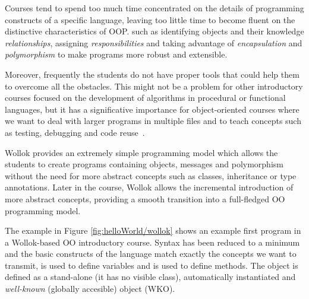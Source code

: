
Courses tend to spend too much time concentrated on the details of programming constructs of a specific language, leaving too little time to become fluent on the distinctive characteristics of OOP. 
such as identifying objects and their knowledge \emph{relationships}, assigning \emph{responsibilities} 
and taking advantage of \emph{encapsulation} and \emph{polymorphism} to make programs more robust and extensible.

Moreover, frequently the students do not have proper tools that could help them to overcome all the obstacles.
This might not be a problem for other introductory courses focused on the development of algorithms in procedural or functional languages, 
but it has a significative importance for object-oriented courses where we want to deal with larger programs in multiple files and to teach concepts such as testing, debugging and code reuse~\cite{kolling_problem_1999}. 

\medskip


\label{sec:wollokLanguage}


Wollok provides an extremely simple programming model which allows the students to create programs containing objects, 
messages and polymorphism without the need for more abstract concepts such as classes, inheritance or type annotations.
Later in the course, Wollok allows the incremental introduction of more abstract concepts,
providing a smooth transition into a full-fledged OO programming model.

The example in Figure \ref{fig:helloWorld/wollok} shows an example first program in a Wollok-based OO introductory course.
Syntax has been reduced to a minimum and the basic constructs of the language match exactly the concepts we want to transmit, \eg {} is used to define variables and  is used to define methods.
The  object is defined as a stand-alone (\ie it has no visible class), automatically instantiated and \emph{well-known} (\ie globally accesible) object (WKO).


